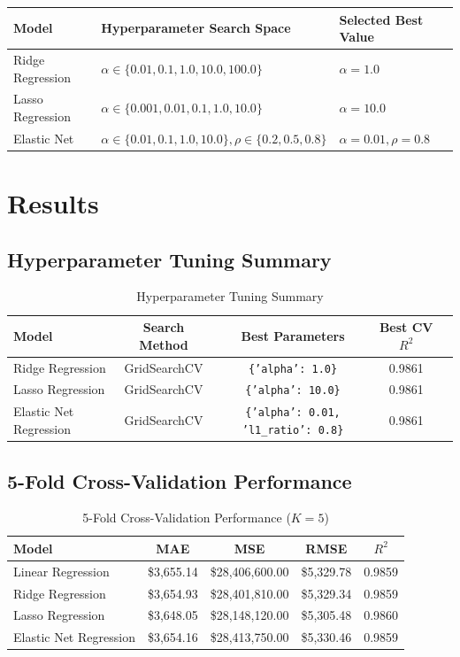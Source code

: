 \documentclass[12pt,a4paper]{article}
\begin{document}
\begin{table}[!htbp]
\centering
\begin{tabular}{lll}
\toprule
Model & Hyperparameter Search Space & Selected Best Value \\
\midrule
Ridge Regression & $\alpha \in \{0.01, 0.1, 1.0, 10.0, 100.0\}$ & $\alpha = 1.0$ \\
Lasso Regression & $\alpha \in \{0.001, 0.01, 0.1, 1.0, 10.0\}$ & $\alpha = 10.0$ \\
Elastic Net & $\alpha \in \{0.01, 0.1, 1.0, 10.0\}, \rho \in \{0.2, 0.5, 0.8\}$ & $\alpha = 0.01, \rho = 0.8$ \\
\bottomrule
\end{tabular}
\end{table}

\section{Results}

\subsection{Hyperparameter Tuning Summary}
\begin{table}[!htbp]
\centering
\caption{Hyperparameter Tuning Summary}
\begin{tabular}{lcccc}
\toprule
Model & Search Method & Best Parameters & Best CV $R^2$ \\
\midrule
Ridge Regression & GridSearchCV & \texttt{\{'alpha': 1.0\}} & 0.9861 \\
Lasso Regression & GridSearchCV & \texttt{\{'alpha': 10.0\}} & 0.9861 \\
Elastic Net Regression & GridSearchCV & \texttt{\{'alpha': 0.01, 'l1\_ratio': 0.8\}} & 0.9861 \\
\bottomrule
\end{tabular}
\end{table}

\subsection{5-Fold Cross-Validation Performance}
\begin{table}[!htbp]
\centering
\caption{5-Fold Cross-Validation Performance ($K=5$)}
\begin{tabular}{lcccc}
\toprule
Model & MAE & MSE & RMSE & $R^2$ \\
\midrule
Linear Regression & \$3,655.14 & \$28,406,600.00 & \$5,329.78 & 0.9859 \\
Ridge Regression & \$3,654.93 & \$28,401,810.00 & \$5,329.34 & 0.9859 \\
Lasso Regression & \$3,648.05 & \$28,148,120.00 & \$5,305.48 & 0.9860 \\
Elastic Net Regression & \$3,654.16 & \$28,413,750.00 & \$5,330.46 & 0.9859 \\
\bottomrule
\end{tabular}
\end{table}
\end{document}
